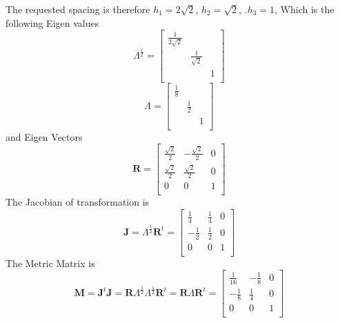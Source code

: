 \documentclass{article}
\begin{document}
The requested spacing is therefore $h_1=2\sqrt{2}$, $h_2=\sqrt{2}$, .$h_3=1$, 
Which is the following Eigen values
\begin{equation}
 \Lambda^\frac{1}{2}=\left[
 \begin{array}{ccc}
   \frac{1}{2\sqrt{2}}&&\\
   &\frac{1}{\sqrt{2}}&\\
   &&1\\
 \end{array}\right]
\end{equation}
\begin{equation}
 \Lambda=\left[
 \begin{array}{ccc}
   \frac{1}{8}&&\\
   &\frac{1}{2}&\\
   &&1\\
 \end{array}\right]
\end{equation}
and Eigen Vectors
\begin{equation}
 \mathbf{R}=\left[
 \begin{array}{ccc}
   \frac{\sqrt{2}}{2}&-\frac{\sqrt{2}}{2}&0\\
   \frac{\sqrt{2}}{2}&\frac{\sqrt{2}}{2}&0\\
   0&0&1\\
 \end{array}\right]
\end{equation}
The Jacobian of transformation is
\begin{equation}
 \mathbf{J}=\Lambda^\frac{1}{2}\mathbf{R}^t=\left[
 \begin{array}{ccc}
   \frac{1}{4}&\frac{1}{4}&0\\
   -\frac{1}{2}&\frac{1}{2}&0\\
   0&0&1\\
 \end{array}\right]
\end{equation}
The Metric Matrix is 
\begin{equation}
 \mathbf{M}=
  \mathbf{J}^t\mathbf{J}=
  \mathbf{R}\Lambda^\frac{1}{2}\Lambda^\frac{1}{2}\mathbf{R}^t=
  \mathbf{R}\Lambda\mathbf{R}^t=
  \left[\begin{array}{ccc}
   \frac{1}{16}&-\frac{1}{8}&0\\
   -\frac{1}{8}&\frac{1}{4}&0\\
   0&0&1\\
 \end{array}\right]
\end{equation}
\end{document}
